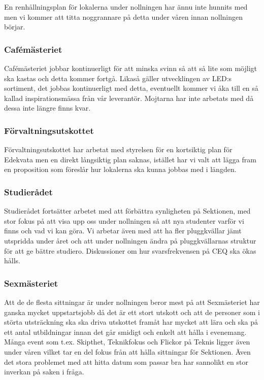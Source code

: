\documentclass[../_main/handlingar.tex]{subfiles}
\begin{document}
En renhållningsplan för lokalerna under nollningen har ännu inte hunnits med men vi kommer att titta noggrannare på detta under våren innan nollningen börjar.

\subsubsection*{Cafémästeriet}
Cafémästeriet jobbar kontinuerligt för att minska svinn så att så lite som möjligt ska kastas och detta kommer fortgå. Likaså gäller utvecklingen av LED:s sortiment, det jobbas kontinuerligt med detta, eventuellt kommer vi åka till en så kallad inspirationsmässa från vår leverantör. Mojtarna har inte arbetats med då dessa inte längre finns kvar.

\subsubsection*{Förvaltningsutskottet}
Förvaltningsutskottet har arbetat med styrelsen för en kortsiktig plan för Edekvata men en direkt långsiktig plan saknas, istället har vi valt att lägga fram en proposition som föreslår hur lokalerna ska kunna jobbas med i längden.

\subsubsection*{Studierådet}
Studierådet fortsätter arbetet med att förbättra synligheten på Sektionen, med stor fokus på att visa upp oss under nollningen så att nya studenter varför vi finns och vad vi kan göra. Vi arbetar även med att ha fler pluggkvällar jämt utspridda under året och att under nollningen ändra på pluggkvällarnas struktur för att ge bättre studiero. Diskussioner om hur svarsfrekvensen på CEQ ska ökas hålls.

\subsubsection*{Sexmästeriet}
Att de de flesta sittningar är under nollningen beror mest på att Sexmästeriet har ganska mycket uppstartsjobb då det är ett stort utskott och att de personer som i störta utsträckning ska ska driva utskottet framåt har mycket att lära och ska på ett antal utbildningar innan det går smidigt och enkelt att hålla i evenemang. Många event som t.ex. Skipthet, Teknikfokus och Flickor på Teknis ligger även under våren vilket tar en del fokus från att hålla sittningar för Sektionen. Även det stora problemet med att hitta datum som passar bra har sannolikt en stor inverkan på saken i fråga.
\end{document}
